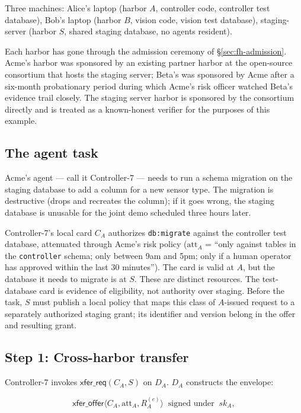 \documentclass[11pt,a4paper]{article}
\theoremstyle{definition}
\theoremstyle{remark}
\begin{document}
Three machines: Alice's laptop (harbor $A$, controller code, controller test database), Bob's laptop (harbor $B$, vision code, vision test database), staging-server (harbor $S$, shared staging database, no agents resident).

Each harbor has gone through the admission ceremony of \S\ref{sec:fh-admission}. Acme's harbor was sponsored by an existing partner harbor at the open-source consortium that hosts the staging server; Beta's was sponsored by Acme after a six-month probationary period during which Acme's risk officer watched Beta's evidence trail closely. The staging server harbor is sponsored by the consortium directly and is treated as a known-honest verifier for the purposes of this example.

\subsection{The agent task}\label{sec:fh-ex-task}

Acme's agent --- call it Controller-7 --- needs to run a schema migration on the staging database to add a column for a new sensor type. The migration is destructive (drops and recreates the column); if it goes wrong, the staging database is unusable for the joint demo scheduled three hours later.

Controller-7's local card $C_A$ authorizes \texttt{db:migrate} against the controller test database, attenuated through Acme's risk policy ($\mathrm{att}_A$ = ``only against tables in the \texttt{controller} schema; only between 9am and 5pm; only if a human operator has approved within the last 30 minutes''). The card is valid at $A$, but the database it needs to migrate is at $S$.
These are distinct resources. The test-database card is evidence of eligibility,
not authority over staging. Before the task, $S$ must publish a local policy
that maps this class of $A$-issued request to a separately authorized staging
grant; its identifier and version belong in the offer and resulting grant.

\subsection{Step 1: Cross-harbor transfer}\label{sec:fh-ex-xfer}

Controller-7 invokes $\mathsf{xfer\_req}(C_A, S)$ on $D_A$. $D_A$ constructs the envelope:

\[
\mathsf{xfer\_offer}\langle C_A, \mathrm{att}_A, R_A^{(e)} \rangle \;\;\text{signed under}\;\; \mathit{sk}_A,
\]
\end{document}
